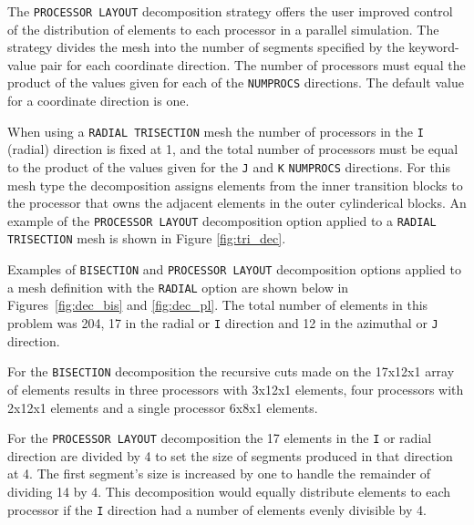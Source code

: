 The \texttt{PROCESSOR LAYOUT} decomposition strategy offers the user
improved control of the distribution of elements to each
processor in a parallel simulation. The strategy divides the mesh into the number of segments specified by the keyword-value pair for each coordinate direction. The number of
processors must equal the product of the values given for each of the
\texttt{NUMPROCS} directions. The default value for a coordinate direction is one.  

When using a \texttt{RADIAL TRISECTION} mesh the number of processors in the \texttt{I} (radial) direction is fixed at 1, and the total number of processors must be equal to the
product of the values given for the \texttt{J} and \texttt{K}
\texttt{NUMPROCS} directions. For this mesh type the decomposition
assigns elements from the inner transition blocks to the processor
that owns the adjacent elements in the outer cylinderical blocks.
An example of the \texttt{PROCESSOR LAYOUT} decomposition option
applied to a \texttt{RADIAL TRISECTION} mesh is shown in Figure \ref{fig:tri_dec}.

Examples of \texttt{BISECTION} and
\texttt{PROCESSOR LAYOUT} decomposition options applied to a mesh definition with the
\texttt{RADIAL} option are shown below in
Figures~\ref{fig:dec_bis} and
 \ref{fig:dec_pl}. The total
number of elements in this problem was 204, 17 in the radial or
\texttt{I} direction and 12 in the azimuthal or \texttt{J} direction.

For the \texttt{BISECTION} decomposition the recursive cuts made on
the 17x12x1 array of elements results in three processors with 3x12x1 elements,
four processors with 2x12x1
elements and a single processor 6x8x1 elements. 

For the \texttt{PROCESSOR LAYOUT} decomposition the
17 elements in the \texttt{I} or radial direction are divided by 4 to
set the size of segments produced in that direction at 4. The first segment's size is increased by one to handle the remainder of dividing 14 by 4. This decomposition would equally
distribute elements to each processor if the \texttt{I} direction had a number of
elements evenly divisible by 4.

